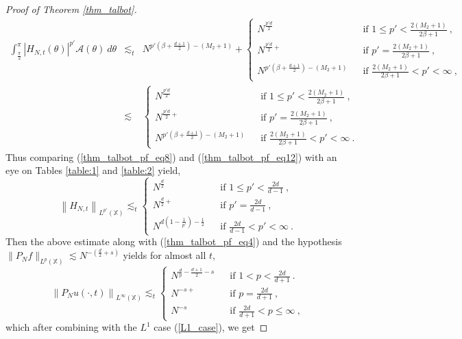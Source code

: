 \documentclass[12pt]{amsart}
\theoremstyle{definition}
\newcommand{\X}{\mathbb X}%
\numberwithin{equation}{section}
\begin{document}
\begin{proof}[Proof of Theorem \ref{thm_talbot}]
\begin{eqnarray}
\int_{\frac{\pi}{2}}^\pi \left|H_{N,t}(\theta)\right|^{p'}\mathcal{A}(\theta)\:d\theta &\lesssim_t & N^{p'\left(\beta+\frac{d+1}{2}\right)-(M_2+1)} + \begin{cases}
      N^{\frac{p'd}{2}}\:\:&\text{ if } 1 \le p' < \frac{2(M_2+1)}{2\beta +1}\:,\\
	 N^{\frac{p'd}{2}+}\:\:&\text{ if } p' =\frac{2(M_2+1)}{2\beta +1}\:,\\
	 N^{p'\left(\beta+\frac{d+1}{2}\right)-(M_2+1)} \:\:&\text{ if }  \frac{2(M_2+1)}{2\beta +1} <p' <\infty\:,
	\end{cases}
\nonumber\\
&\lesssim & \begin{cases}
      N^{\frac{p'd}{2}}\:\:&\text{ if } 1 \le p' < \frac{2(M_2+1)}{2\beta +1}\:,\\
	 N^{\frac{p'd}{2}+}\:\:&\text{ if } p' =\frac{2(M_2+1)}{2\beta +1}\:,\\
	 N^{p'\left(\beta+\frac{d+1}{2}\right)-(M_2+1)} \:\:&\text{ if }  \frac{2(M_2+1)}{2\beta +1} <p' <\infty\:.
	\end{cases}
\end{eqnarray}
Thus comparing (\ref{thm_talbot_pf_eq8}) and (\ref{thm_talbot_pf_eq12}) with an eye on Tables \ref{table:1} and \ref{table:2} yield,
\begin{equation*} 
\left\|H_{N,t}\right\|_{L^{p'}(\X)} \lesssim_t \begin{cases}
      N^{\frac{d}{2}}\:\:&\text{ if } 1 \le p' < \frac{2d}{d-1}\:,\\
	 N^{\frac{d}{2}+}\:\:&\text{ if } p' = \frac{2d}{d-1}\:,\\
	 N^{d\left(1-\frac{1}{p'}\right)-\frac{1}{2}}\:\:&\text{ if }  \frac{2d}{d-1}<p'<\infty\:.
	\end{cases}
\end{equation*}
Then the above estimate along with (\ref{thm_talbot_pf_eq4}) and the hypothesis $\|P_Nf\|_{L^p(\X)} \lesssim N^{-\left(\frac{d}{2}+s\right)}$ yields for almost all $t$,
\begin{equation*}
\left\|P_Nu(\cdot,t)\right\|_{L^\infty(\X)} \lesssim_t \begin{cases}
	 N^{\frac{d}{p}-\frac{d+1}{2}-s}\:\:&\text{ if } 1<p < \frac{2d}{d+1}\:.\\
	 	 N^{-s+}\:\:&\text{ if } p=\frac{2d}{d+1}\:,\\
	 	 N^{-s}\:\:&\text{ if } \frac{2d}{d+1} < p \le \infty\:,
	\end{cases}
\end{equation*}
which after combining with the $L^1$ case (\ref{L1_case}), we get

\end{proof}
\end{document}
